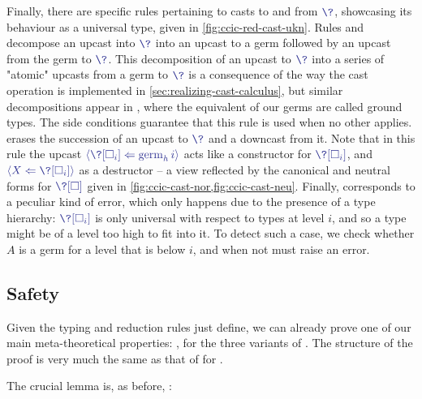 Finally, there are specific rules pertaining to casts to and from $\tcol{\?}$,
showcasing its behaviour as a universal type, given in \cref{fig:ccic-red-cast-ukn}.
Rules  and  decompose an upcast into
$\tcol{\?}$ into an upcast to a germ followed by an upcast from the germ to $\tcol{\?}$.
This decomposition of an upcast to $\tcol{\?}$ into a series of "atomic" upcasts from a germ to
$\tcol{\?}$ is a consequence of the way the cast operation is implemented in
\cref{sec:realizing-cast-calculus}, but similar decompositions appear \eg in ,
where the equivalent of our germs are called ground types.
The side conditions guarantee that this rule is used when no other applies.
%
 erases the succession of an upcast to $\tcol{\?}$
and a downcast from it. Note that in this rule the upcast
$\tcol{\castrev{}{\stalkCIC{h}{i}}{\?[\uni[i]]}}$ acts like a constructor for
$\tcol{\?[\uni[i]]}$, and $\tcol{\castrev{}{\?[\uni[i]]}{X}}$ as a destructor –
a view reflected by the canonical and neutral forms for $\tcol{\?[\uni]}$ given in
\cref{fig:ccic-cast-nor,fig:ccic-cast-neu}.%
%
Finally,  corresponds to a peculiar kind of error, which only happens due to the presence of a type hierarchy: 
$\tcol{\?[\uni[i]]}$ is only universal with respect to types at level $i$, and so a type might
be of a level too high to fit into it.
To detect such a case, we check whether $A$ is a germ for a level that is below $i$,
and when not must raise an error.

\subsection{Safety}

Given the typing and reduction rules just define, we can already prove one of our main
meta-theoretical properties:
, for the three variants of .
The structure of the proof is very much the same as that of  for
.

%
The crucial lemma is, as before, :

